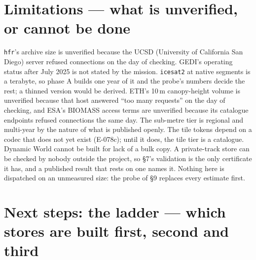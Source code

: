 \documentclass[10pt]{article}
\newcommand{\code}[1]{\texttt{#1}}
\begin{document}
\section{Limitations --- what is unverified, or cannot be done}

\code{hfr}'s archive size is unverified because the UCSD (University of California San Diego) server refused
connections on the day of checking. GEDI's operating status after July 2025
is not stated by the mission. \code{icesat2} at native segments is a
terabyte, so phase A builds one year of it and the probe's numbers decide
the rest; a thinned version would be derived. ETH's 10\,m canopy-height
volume is unverified because that host answered ``too many requests'' on the
day of checking, and ESA's BIOMASS access terms are unverified because its
catalogue endpoints refused connections the same day. The sub-metre
tier is regional and multi-year by the nature of what is published openly.
The tile tokens depend on a codec that does not yet exist (E-078c); until it
does, the tile tier is a catalogue. Dynamic World cannot be built for lack
of a bulk copy. A private-track store can be checked by nobody outside the
project, so \S7's validation is the only certificate it has, and a published
result that rests on one names it. Nothing here is dispatched on an unmeasured size: the probe
of \S9 replaces every estimate first.

\section{Next steps: the ladder --- which stores are built first, second and third}
\end{document}
